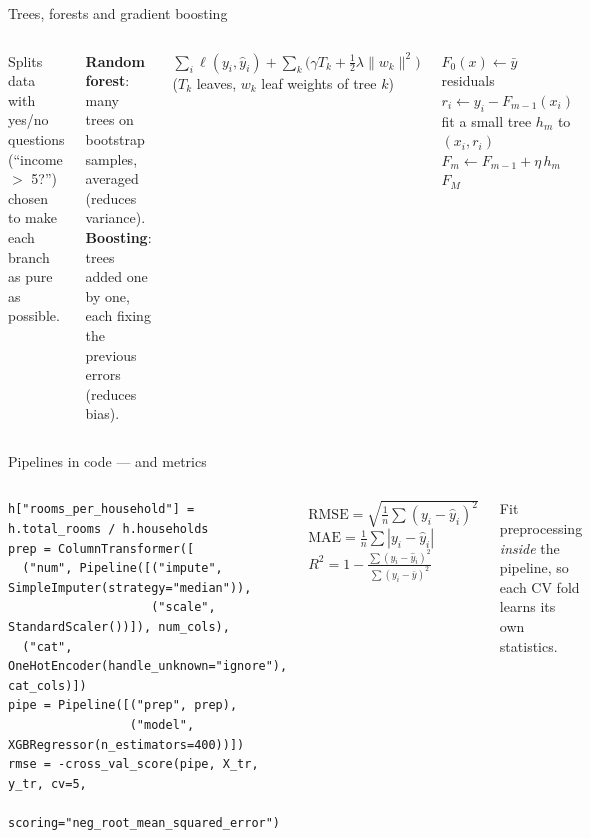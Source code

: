 \documentclass[aspectratio=169,11pt]{beamer}
\begin{document}
\begin{frame}{Trees, forests and gradient boosting}
\begin{columns}[T]
\begin{bdef}
Splits data with yes/no questions (``income $>$ 5?'') chosen to make each branch as pure as possible.
\end{bdef}
\begin{bdef}[Ensembles]
\textbf{Random forest}: many trees on bootstrap samples, averaged (reduces variance).
\textbf{Boosting}: trees added one by one, each fixing the previous errors (reduces bias).
\end{bdef}
\begin{bmath}
$\sum_i \ell(y_i,\hat y_i)+\sum_k\big(\gamma T_k+\tfrac12\lambda\lVert w_k\rVert^2\big)$\\ ($T_k$ leaves, $w_k$ leaf weights of tree $k$)
\end{bmath}
\begin{balgo}
\begin{algorithmic}[1]
\State $F_0(x)\gets \bar y$
  \State residuals $r_i\gets y_i-F_{m-1}(x_i)$
  \State fit a small tree $h_m$ to $(x_i,r_i)$
  \State $F_m\gets F_{m-1}+\eta\,h_m$
\EndFor
\State \Return $F_M$
\end{algorithmic}
\end{balgo}
\end{columns}
\end{frame}

\begin{frame}[fragile]{Pipelines in code --- and metrics}
\begin{columns}[T]
\begin{bcode}
\begin{lstlisting}
h["rooms_per_household"] = h.total_rooms / h.households
prep = ColumnTransformer([
  ("num", Pipeline([("impute", SimpleImputer(strategy="median")),
                    ("scale", StandardScaler())]), num_cols),
  ("cat", OneHotEncoder(handle_unknown="ignore"), cat_cols)])
pipe = Pipeline([("prep", prep),
                 ("model", XGBRegressor(n_estimators=400))])
rmse = -cross_val_score(pipe, X_tr, y_tr, cv=5,
          scoring="neg_root_mean_squared_error")
\end{lstlisting}
\end{bcode}
\begin{bmath}
$\mathrm{RMSE}=\sqrt{\frac1n\sum(y_i-\hat y_i)^2}$\\[2pt]
$\mathrm{MAE}=\frac1n\sum|y_i-\hat y_i|$\\[2pt]
$R^2=1-\frac{\sum(y_i-\hat y_i)^2}{\sum(y_i-\bar y)^2}$
\end{bmath}
\begin{bwarn}
Fit preprocessing \emph{inside} the pipeline, so each CV fold learns its own statistics.
\end{bwarn}
\end{columns}
\end{frame}
\end{document}
